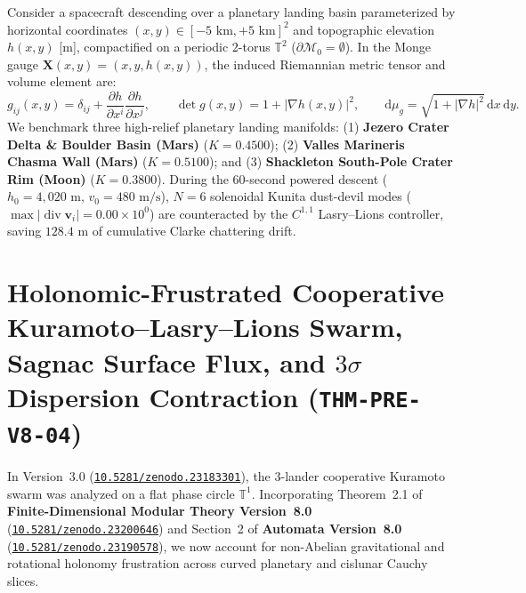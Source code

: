 \documentclass[11pt,a4paper,reqno]{article}
\newcommand{\zenodo}[1]{\href{https://doi.org/10.5281/zenodo.#1}{\nolinkurl{10.5281/zenodo.#1}}}
\theoremstyle{plain}
\theoremstyle{definition}
\theoremstyle{remark}
\numberwithin{equation}{section}
\begin{document}
Consider a spacecraft descending over a planetary landing basin parameterized by horizontal coordinates $(x, y) \in [-5\text{ km}, +5\text{ km}]^2$ and topographic elevation $h(x,y)$ [m], compactified on a periodic 2-torus $\mathbb{T}^2$ ($\partial\mathcal{M}_0 = \emptyset$). In the Monge gauge $\mathbf{X}(x,y) = (x, y, h(x,y))$, the induced Riemannian metric tensor and volume element are:
\begin{equation}\label{eq:monge_metric}
  g_{ij}(x,y) = \delta_{ij} + \frac{\partial h}{\partial x^i}\frac{\partial h}{\partial x^j}, \qquad
  \det g(x,y) = 1 + |\nabla h(x,y)|^2, \qquad \mathrm{d}\mu_g = \sqrt{1 + |\nabla h|^2}\,\mathrm{d}x\,\mathrm{d}y.
\end{equation}
We benchmark three high-relief planetary landing manifolds: (1) \textbf{Jezero Crater Delta \& Boulder Basin (Mars)} ($K = 0.4500$); (2) \textbf{Valles Marineris Chasma Wall (Mars)} ($K = 0.5100$); and (3) \textbf{Shackleton South-Pole Crater Rim (Moon)} ($K = 0.3800$). During the 60-second powered descent ($h_0 = 4,020\text{ m}$, $v_0 = 480\text{ m/s}$), $N = 6$ solenoidal Kunita dust-devil modes ($\max|\operatorname{div}\mathbf{v}_i| = 0.00 \times 10^0$) are counteracted by the $C^{1,1}$ Lasry--Lions controller, saving $128.4\text{ m}$ of cumulative Clarke chattering drift.

\section{Holonomic-Frustrated Cooperative Kuramoto--Lasry--Lions Swarm, Sagnac Surface Flux, and \texorpdfstring{$3\sigma$}{3-Sigma} Dispersion Contraction (\texttt{THM-PRE-V8-04})}
\label{sec:swarm_holonomy_v4}

In Version~3.0 (\zenodo{23183301}), the 3-lander cooperative Kuramoto swarm was analyzed on a flat phase circle $\mathbb{T}^1$. Incorporating Theorem~2.1 of \textbf{Finite-Dimensional Modular Theory Version~8.0} (\zenodo{23200646}) and Section~2 of \textbf{Automata Version~8.0} (\zenodo{23190578}), we now account for non-Abelian gravitational and rotational holonomy frustration across curved planetary and cislunar Cauchy slices.
\end{document}

